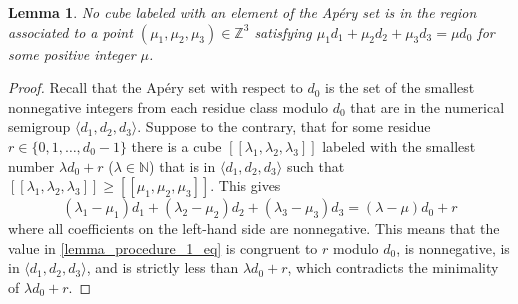 \documentclass[12pt]{article}
\newtheorem{lemma}[thm]{Lemma}
\theoremstyle{remark}
\begin{document}
\begin{lemma}\label{lemma_procedure_1}
   No cube labeled with an element of the Ap{\'e}ry set is in the region associated to a point $(\mu_1,\mu_2,\mu_3) \in \mathbb{Z}^3$ satisfying $\mu_1d_1 + \mu_2d_2 + \mu_3d_3 = \mu d_0$ for some positive integer $\mu$. 
\end{lemma}

\begin{proof}
    Recall that the Ap{\'e}ry set with respect to $d_0$ is the set of the smallest nonnegative integers from each residue class modulo $d_0$ that are in the numerical semigroup $\langle d_1,d_2,d_3\rangle$. Suppose to the contrary, that for some residue $r \in \{0,1,\dots,d_0-1\}$ there is a cube $[[\lambda_1,\lambda_2,\lambda_3]]$ labeled with the smallest number $\lambda d_0 + r$ ($\lambda \in \mathbb{N}$) that is in $\langle d_1,d_2,d_3\rangle$ such that $[[\lambda_1,\lambda_2,\lambda_3]] \geq [[\mu_1,\mu_2,\mu_3]]$. This gives
    \begin{equation}\label{lemma_procedure_1_eq}
     (\lambda_1 -\mu_1) d_1 + (\lambda_2-\mu_2) d_2 + (\lambda_3-\mu_3) d_3 = (\lambda-\mu) d_0 + r
    \end{equation}
    where all coefficients on the left-hand side are nonnegative. This means that the value in \eqref{lemma_procedure_1_eq} is congruent to $r$ modulo $d_0$, is nonnegative, is in $\langle d_1,d_2,d_3\rangle$, and is strictly less than $\lambda d_0 + r$, which contradicts the minimality of $\lambda d_0 + r$.
\end{proof}
\end{document}
